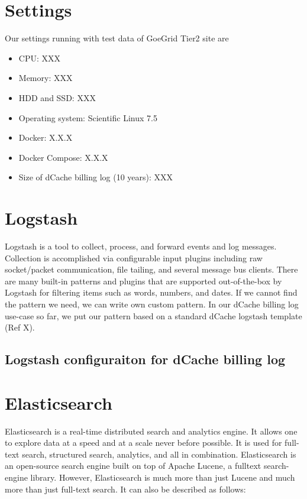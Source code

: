 \documentclass[]{article}
\begin{document}
\section{Settings}\label{settings}

Our settings running with test data of GoeGrid Tier2 site are

\begin{itemize}
\itemsep1pt\parskip0pt
\item
  CPU: XXX
\item
  Memory: XXX
\item
  HDD and SSD: XXX
\item
  Operating system: Scientific Linux 7.5
\item
  Docker: X.X.X
\item
  Docker Compose: X.X.X
\item
  Size of dCache billing log (10 years): XXX
\end{itemize}

\section{Logstash}\label{logstash}

Logstash is a tool to collect, process, and forward events and log
messages. Collection is accomplished via configurable input plugins
including raw socket/packet communication, file tailing, and several
message bus clients. There are many built-in patterns and plugins that
are supported out-of-the-box by Logstash for filtering items such as
words, numbers, and dates. If we cannot find the pattern we need, we can
write own custom pattern. In our dCache billing log use-case so far, we
put our pattern based on a standard dCache logstash template (Ref X).

\subsection{Logstash configuraiton for dCache billing
log}\label{logstash-configuraiton-for-dcache-billing-log}

\section{Elasticsearch}\label{elasticsearch}

Elasticsearch is a real-time distributed search and analytics engine. It
allows one to explore data at a speed and at a scale never before
possible. It is used for full-text search, structured search, analytics,
and all in combination. Elasticsearch is an open-source search engine
built on top of Apache Lucene, a fulltext search-engine library.
However, Elasticsearch is much more than just Lucene and much more than
just full-text search. It can also be described as follows:
\end{document}
